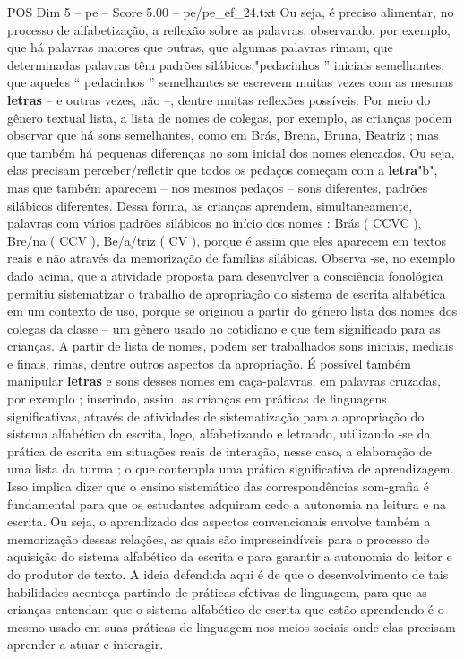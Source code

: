 \begin{textsample}{POS Dim 5 – pe – Score 5.00 – pe/pe\_ef\_24.txt}
Ou seja, é preciso alimentar, no processo de alfabetização, a reflexão sobre as palavras, observando, por exemplo, que há palavras maiores que outras, que algumas palavras rimam, que determinadas palavras têm padrões silábicos,"pedacinhos ” iniciais semelhantes, que aqueles “ pedacinhos ” semelhantes se escrevem muitas vezes com as mesmas \textbf{letras} – e outras vezes, não –, dentre muitas reflexões possíveis.
Por meio do gênero textual lista, a lista de nomes de colegas, por exemplo, as crianças podem observar que há sons semelhantes, como em Brás, Brena, Bruna, Beatriz ; mas que também há pequenas diferenças no som inicial dos nomes elencados.
Ou seja, elas precisam perceber/refletir que todos os pedaços começam com a \textbf{letra}"b", mas que também aparecem – nos mesmos pedaços – sons diferentes, padrões silábicos diferentes.
Dessa forma, as crianças aprendem, simultaneamente, palavras com vários padrões silábicos no início dos nomes : Brás ( CCVC ), Bre/na ( CCV ), Be/a/triz ( CV ), porque é assim que eles aparecem em textos reais e não através da memorização de famílias silábicas.
Observa -se, no exemplo dado acima, que a atividade proposta para desenvolver a consciência fonológica permitiu sistematizar o trabalho de apropriação do sistema de escrita alfabética em um contexto de uso, porque se originou a partir do gênero lista dos nomes dos colegas da classe – um gênero usado no cotidiano e que tem significado para as crianças.
A partir de lista de nomes, podem ser trabalhados sons iniciais, mediais e finais, rimas, dentre outros aspectos da apropriação.
É possível também manipular \textbf{letras} e sons desses nomes em caça-palavras, em palavras cruzadas, por exemplo ; inserindo, assim, as crianças em práticas de linguagens significativas, através de atividades de sistematização para a apropriação do sistema alfabético da escrita, logo, alfabetizando e letrando, utilizando -se da prática de escrita em situações reais de interação, nesse caso, a elaboração de uma lista da turma ; o que contempla uma prática significativa de aprendizagem.
Isso implica dizer que o ensino sistemático das correspondências som-grafia é fundamental para que os estudantes adquiram cedo a autonomia na leitura e na escrita.
Ou seja, o aprendizado dos aspectos convencionais envolve também a memorização dessas relações, as quais são imprescindíveis para o processo de aquisição do sistema alfabético da escrita e para garantir a autonomia do leitor e do produtor de texto.
A ideia defendida aqui é de que o desenvolvimento de tais habilidades aconteça partindo de práticas efetivas de linguagem, para que as crianças entendam que o sistema alfabético de escrita que estão aprendendo é o mesmo usado em suas práticas de linguagem nos meios sociais onde elas precisam aprender a atuar e interagir.

\end{textsample}
